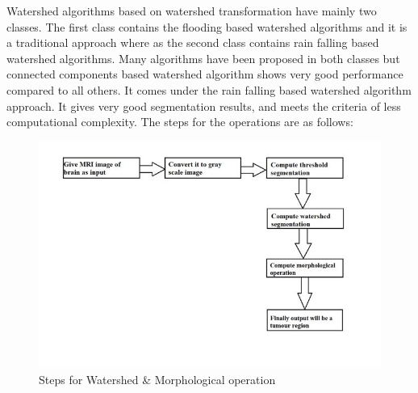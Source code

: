     Watershed algorithms based on watershed transformation have mainly two classes. The first class contains the flooding based watershed algorithms and it is a traditional approach where as the second class contains rain falling based watershed algorithms. Many algorithms have been proposed in both classes but connected components based watershed algorithm shows very  good performance compared to all others. It comes under the rain falling based watershed algorithm approach. It gives very good segmentation results, and meets the criteria of less computational complexity.
    \newpage
    The steps for the operations are as follows:
  
    \begin{figure}[h!]
        \centering
            \includegraphics[scale=0.5]{Figures/water.png}
            \caption{Steps for Watershed & Morphological operation}
            \label{fig:my_label}
     \end{figure}
    
